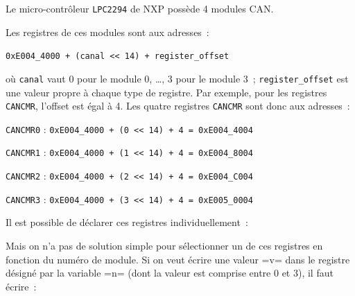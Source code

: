 











Le micro-contrôleur \texttt{LPC2294} de NXP possède 4 modules CAN.


Les registres de ces modules sont aux adresses~:

\texttt{0xE004\_4000 + (canal << 14) + register\_offset}

où \texttt{canal} vaut $0$ pour le module $0$, …, $3$ pour le module 3~; \texttt{register\_offset} est une valeur propre à chaque type de registre. Par exemple, pour les registres \texttt{CANCMR}, l'offset est égal à 4. Les quatre registres \texttt{CANCMR} sont donc aux adresses~:

\texttt{CANCMR0} : \texttt{0xE004\_4000 + (0 << 14) + 4 = 0xE004\_4004}

\texttt{CANCMR1} : \texttt{0xE004\_4000 + (1 << 14) + 4 = 0xE004\_8004}

\texttt{CANCMR2} : \texttt{0xE004\_4000 + (2 << 14) + 4 = 0xE004\_C004}

\texttt{CANCMR3} : \texttt{0xE004\_4000 + (3 << 14) + 4 = 0xE005\_0004}

Il est possible de déclarer ces registres individuellement~:


Mais on n'a pas de solution simple pour sélectionner un de ces registres en fonction du numéro de module. Si on veut écrire une valeur \plm=v= dans le registre désigné par la variable \plm=n= (dont la valeur est comprise entre $0$ et $3$), il faut écrire~:

